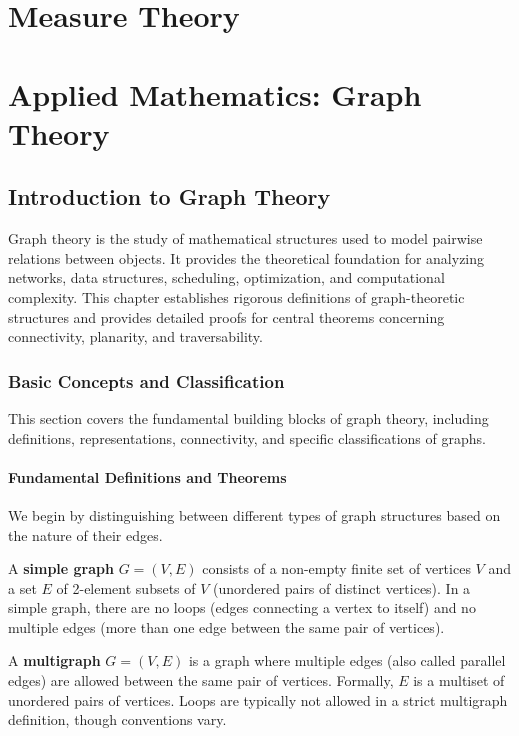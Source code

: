 \chapter{Measure Theory}



\chapter{Applied Mathematics: Graph Theory}

\section{Introduction to Graph Theory}

Graph theory is the study of mathematical structures used to model pairwise relations between objects. It provides the theoretical foundation for analyzing networks, data structures, scheduling, optimization, and computational complexity. This chapter establishes rigorous definitions of graph-theoretic structures and provides detailed proofs for central theorems concerning connectivity, planarity, and traversability.

\subsection{Basic Concepts and Classification}

This section covers the fundamental building blocks of graph theory, including definitions, representations, connectivity, and specific classifications of graphs.

\subsubsection{Fundamental Definitions and Theorems}

We begin by distinguishing between different types of graph structures based on the nature of their edges.

\begin{definition}
A \textbf{simple graph} $G = (V, E)$ consists of a non-empty finite set of vertices $V$ and a set $E$ of 2-element subsets of $V$ (unordered pairs of distinct vertices). In a simple graph, there are no loops (edges connecting a vertex to itself) and no multiple edges (more than one edge between the same pair of vertices).
\end{definition}

\begin{definition}[Multigraph]
A \textbf{multigraph} $G = (V, E)$ is a graph where multiple edges (also called parallel edges) are allowed between the same pair of vertices. Formally, $E$ is a multiset of unordered pairs of vertices. Loops are typically not allowed in a strict multigraph definition, though conventions vary.
\end{definition}

